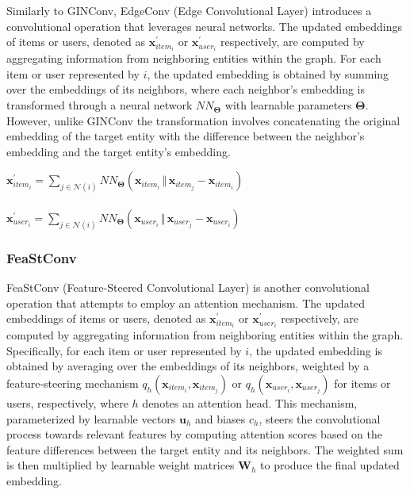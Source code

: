 \documentclass[bst/sn-nature]{sn-jnl}
\begin{document}
\begin{multicols}{2}
\quad Similarly to GINConv, EdgeConv (Edge Convolutional Layer) introduces a convolutional operation that leverages neural networks. The updated embeddings of items or users, denoted as $\mathbf{x}^{\prime}_{item_i}$ or $\mathbf{x}^{\prime}_{user_i}$ respectively, are computed by aggregating information from neighboring entities within the graph. For each item or user represented by $i$, the updated embedding is obtained by summing over the embeddings of its neighbors, where each neighbor's embedding is transformed through a neural network $NN_{\mathbf{\Theta}}$ with learnable parameters $\mathbf{\Theta}$. However, unlike GINConv the transformation involves concatenating the original embedding of the target entity with the difference between the neighbor's embedding and the target entity's embedding. \\ 

\begin{center}
    $\mathbf{x}^{\prime}_{item_{i}} = \sum_{j \in \mathcal{N}(i)} NN_{\mathbf{\Theta}}(\mathbf{x}_{item_{i}} \, \Vert \, \mathbf{x}_{item_{j}} - \mathbf{x}_{item_{i}})$ \\~\\
    $\mathbf{x}^{\prime}_{user_{i}} = \sum_{j \in \mathcal{N}(i)} NN_{\mathbf{\Theta}}(\mathbf{x}_{user_{i}} \, \Vert \, \mathbf{x}_{user_{j}} - \mathbf{x}_{user_{i}})$
\end{center}


\subsubsection{FeaStConv\cite{feastconv}} 

\quad FeaStConv (Feature-Steered Convolutional Layer) is another  convolutional operation that attempts to employ an attention mechanism. The updated embeddings of items or users, denoted as $\mathbf{x}^{\prime}_{item_i}$ or $\mathbf{x}^{\prime}_{user_i}$ respectively, are computed by aggregating information from neighboring entities within the graph. Specifically, for each item or user represented by $i$, the updated embedding is obtained by averaging over the embeddings of its neighbors, weighted by a feature-steering mechanism $q_h(\mathbf{x}_{item_i}, \mathbf{x}_{item_j})$ or $q_h(\mathbf{x}_{user_i}, \mathbf{x}_{user_j})$ for items or users, respectively, where $h$ denotes an attention head. This mechanism, parameterized by learnable vectors $\mathbf{u}_h$ and biases $c_h$, steers the convolutional process towards relevant features by computing attention scores based on the feature differences between the target entity and its neighbors. The weighted sum is then multiplied by learnable weight matrices $\mathbf{W}_h$ to produce the final updated embedding. \\ 


\end{multicols}
\end{document}
